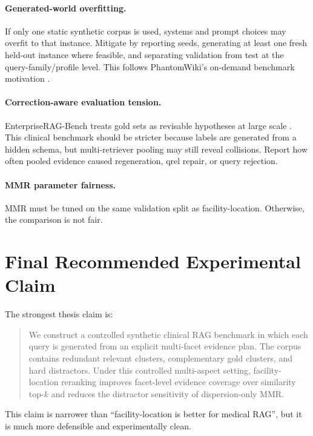 \documentclass[11pt,a4paper]{article}
\begin{document}
\paragraph{Generated-world overfitting.}
If only one static synthetic corpus is used, systems and prompt choices may overfit to that instance. Mitigate by reporting seeds, generating at least one fresh held-out instance where feasible, and separating validation from test at the query-family/profile level. This follows PhantomWiki's on-demand benchmark motivation \citep{gong2025phantomwiki}.

\paragraph{Correction-aware evaluation tension.}
EnterpriseRAG-Bench treats gold sets as revisable hypotheses at large scale \citep{sun2026enterpriseragbench}. This clinical benchmark should be stricter because labels are generated from a hidden schema, but multi-retriever pooling may still reveal collisions. Report how often pooled evidence caused regeneration, qrel repair, or query rejection.

\paragraph{MMR parameter fairness.}
MMR must be tuned on the same validation split as facility-location. Otherwise, the comparison is not fair.

\section{Final Recommended Experimental Claim}

The strongest thesis claim is:

\begin{quote}
	We construct a controlled synthetic clinical RAG benchmark in which each query is generated from an explicit multi-facet evidence plan. The corpus contains redundant relevant clusters, complementary gold clusters, and hard distractors. Under this controlled multi-aspect setting, facility-location reranking improves facet-level evidence coverage over similarity top-$k$ and reduces the distractor sensitivity of dispersion-only MMR.
\end{quote}

This claim is narrower than ``facility-location is better for medical RAG'', but it is much more defensible and experimentally clean.
\end{document}

